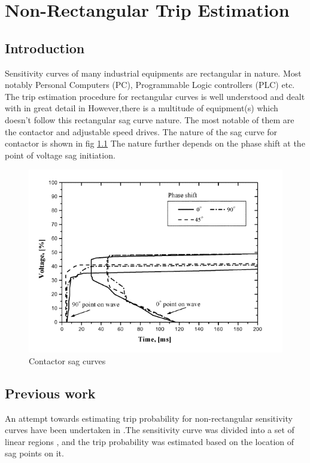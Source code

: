 \documentclass[10pt, a4paper, twocolumn]{extreport}
\begin{document}
	\chapter[Non-Rectangular Trip Estimation]{Non-Rectangular Trip Estimation}
	\section[Introduction]{Introduction} Sensitivity curves of many industrial equipments are rectangular in nature. Most notably Personal Computers (PC), Programmable Logic controllers (PLC) etc. The trip estimation procedure for rectangular curves is well understood and dealt with in great detail in 
	However,there is a multitude of equipment(s) which doesn't follow this rectangular sag curve nature. The most notable of them are the contactor and adjustable speed drives. The nature of the sag curve for contactor is shown in fig 
	\ref{fig:contactor}
	The nature further depends on the phase shift at the point of voltage sag initiation.  	
	\begin{figure}[h!]
		\includegraphics[width=0.8\linewidth]{../1/contactor}
		\caption[Contactor sag curves]{Contactor sag curves}
		\label{fig:contactor}
	\end{figure}
	
	\section[Previous work]{Previous work} An attempt towards estimating trip probability for non-rectangular sensitivity curves have been undertaken in 
	.The sensitivity curve was divided into a set of linear regions , and the trip probability was estimated based on the location of sag points on it.  
\end{document}
